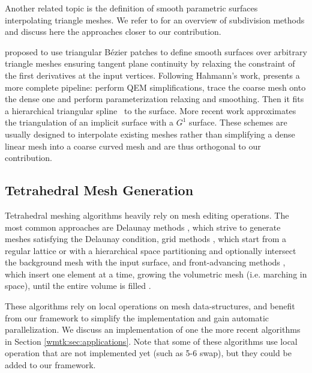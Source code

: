 Another related topic is the definition of smooth parametric surfaces interpolating triangle meshes. We refer to \cite{zorin2000subdivision} for an overview of subdivision methods and discuss here the approaches closer to our contribution.

\cite{Hahmann2003} proposed to use triangular B\'ezier patches to define smooth surfaces over arbitrary triangle meshes ensuring tangent plane continuity by relaxing the constraint of the first derivatives at the input vertices.
%
Following Hahmann's work, \cite{yvart2005smooth} presents a more complete pipeline: perform QEM simplifications, trace the coarse mesh onto the dense one and perform parameterization relaxing and smoothing. Then it fits a hierarchical triangular spline~\cite{Yvart2005hier} to the surface.
%
More recent work \cite{TONG2009} approximates the triangulation of an implicit surface with a $G^1$ surface.
%
These schemes are usually designed to interpolate existing meshes rather than simplifying a dense linear mesh into a coarse curved mesh and are thus orthogonal to our contribution.

\subsection{Tetrahedral Mesh Generation}

Tetrahedral meshing algorithms heavily rely on mesh editing operations. The most common approaches are Delaunay methods \cite{shewchuk1998tetrahedral,ruppert1995delaunay,Remacle:2017:ATL,du2003tetrahedral,alliez2005variational,tournois2009interleaving,murphy2001point,CohenSteiner:2002:CDT,chew1989constrained,si2005meshing,shewchuk2002constrained,Si:2014:ICA,cheng2008practical,boissonnat2005provably,Jamin:2015:CAG,Dey:2008:DAD,Chen:2004:ODT,Shewchuk:1996,Cheng:2012:DMG,Bishop2016,Busaryev:RMI:2009,triangulation_in_cgal,tetgen}, which strive to generate meshes satisfying the Delaunay condition, grid methods \cite{Yerry1983,BERN1994,Molino:2003:TMG,Bronson:2013:LCC,Labelle:2007:ISF,Doran:2013:ISI,code:quartet}, which start from a regular lattice or with a hierarchical space partitioning and optionally intersect the background mesh with the input surface, and front-advancing methods \cite{Sadek1980,Cuilliere:2013:ADM,Alauzet:2014:ACA,Haimes:2014:MMO}, which insert one element at a time, growing the volumetric mesh (i.e. marching in space), until the entire volume is filled .

These algorithms rely on local operations on mesh data-structures, and benefit from our framework to simplify the implementation and gain automatic parallelization. We discuss an implementation of one the more recent algorithms \cite{hu2018tetrahedral,Hu:2019:fTetWild} in Section \ref{wmtk:sec:applications}. Note that some of these algorithms use local operation that are not implemented yet (such as 5-6 swap), but they could be added to our framework.

